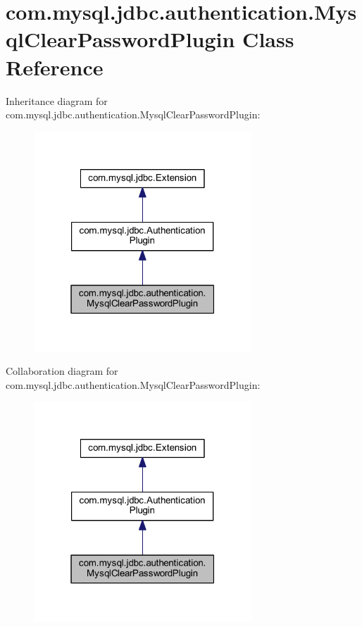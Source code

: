 \hypertarget{classcom_1_1mysql_1_1jdbc_1_1authentication_1_1_mysql_clear_password_plugin}{}\section{com.\+mysql.\+jdbc.\+authentication.\+Mysql\+Clear\+Password\+Plugin Class Reference}
\label{classcom_1_1mysql_1_1jdbc_1_1authentication_1_1_mysql_clear_password_plugin}


Inheritance diagram for com.\+mysql.\+jdbc.\+authentication.\+Mysql\+Clear\+Password\+Plugin\+:
\nopagebreak
\begin{figure}[H]
\begin{center}
\leavevmode
\includegraphics[width=232pt]{classcom_1_1mysql_1_1jdbc_1_1authentication_1_1_mysql_clear_password_plugin__inherit__graph}
\end{center}
\end{figure}


Collaboration diagram for com.\+mysql.\+jdbc.\+authentication.\+Mysql\+Clear\+Password\+Plugin\+:
\nopagebreak
\begin{figure}[H]
\begin{center}
\leavevmode
\includegraphics[width=232pt]{classcom_1_1mysql_1_1jdbc_1_1authentication_1_1_mysql_clear_password_plugin__coll__graph}
\end{center}
\end{figure}
